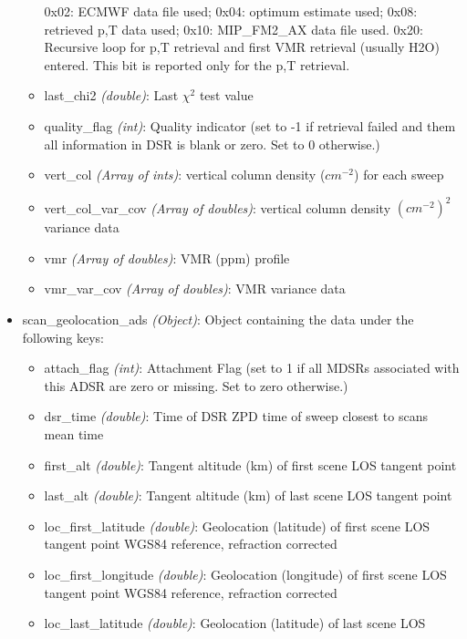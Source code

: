 \begin{itemize}
\begin{itemize}
                0x02: ECMWF data file used;
                0x04: optimum estimate used;
                0x08: retrieved p,T data used;
                0x10: MIP\_FM2\_AX data file used.
                0x20: Recursive loop for p,T retrieval and first VMR retrieval (usually H2O) entered.
                 This bit is reported only for the p,T retrieval.  
            \item last\_chi2 \emph{(double)}: Last \(\chi^2\) test value 
            \item quality\_flag \emph{(int)}: Quality indicator (set to -1 if retrieval failed and them all
                information in DSR is blank or zero. Set to 0 otherwise.)  
            \item vert\_col \emph{(Array of ints)}: vertical column density (\(cm^{-2}\)) for each sweep 
            \item vert\_col\_var\_cov \emph{(Array of doubles)}:  vertical column density \((cm^{-2})^{2}\) variance data
            \item vmr \emph{(Array of doubles)}: VMR (ppm) profile
            \item vmr\_var\_cov \emph{(Array of doubles)}:  VMR variance data
       \end{itemize}
    \item scan\_geolocation\_ads \emph{(Object)}: Object containing the data under the
        following keys:
        \begin{itemize}
            \item attach\_flag \emph{(int)}: Attachment Flag (set to 1 if all MDSRs associated
                with this ADSR are zero or missing. Set to zero otherwise.) 
            \item dsr\_time \emph{(double)}: Time of DSR ZPD time of sweep closest to scans mean time 
            \item first\_alt \emph{(double)}: Tangent altitude (km) of first scene LOS tangent point
            \item last\_alt \emph{(double)}: Tangent altitude (km) of last scene LOS tangent point 
            \item loc\_first\_latitude \emph{(double)}: Geolocation (latitude) of first scene LOS
                tangent point WGS84 reference, refraction corrected 
            \item loc\_first\_longitude \emph{(double)}: Geolocation (longitude) of first scene LOS
                tangent point WGS84 reference, refraction corrected
            \item loc\_last\_latitude \emph{(double)}: Geolocation (latitude) of last scene LOS

\end{itemize}
\end{itemize}
